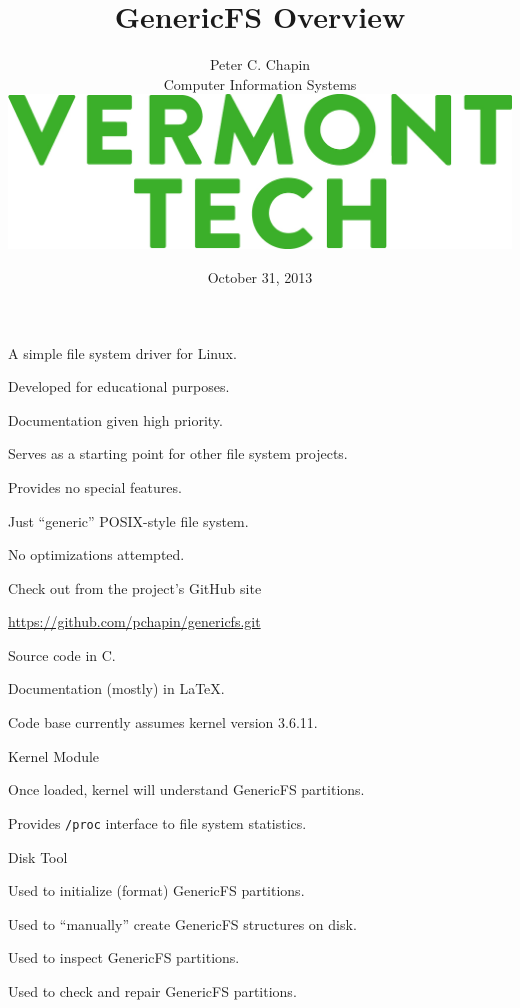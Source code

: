 \documentclass[landscape]{slides}
\title{\color{titlecolor}GenericFS Overview}
\author{
  \begin{tabular}{c}
  \\[3mm]
  \Large{Peter C. Chapin} \\[2mm]
  \normalsize{Computer Information Systems}\\[5mm]
  \includegraphics[scale=0.80]{VermontTech_stack_361.jpg}\\[16mm]
  \end{tabular}
}
\date{October 31, 2013}
\begin{document}
\color{Black}
\pagecolor{Background}

\maketitle


\begin{citemize}
  \item A simple file system driver for Linux.
    \begin{citemize}
    \item Developed for educational purposes.
    \item Documentation given high priority.
    \item Serves as a starting point for other file system projects.
    \end{citemize}
  \item Provides no special features.
    \begin{citemize}
    \item Just ``generic'' POSIX-style file system.
    \item No optimizations attempted.
    \end{citemize}
\end{citemize}
\stopslide


Check out from the project's GitHub site

\vspace{5mm}
\centerline{\url{https://github.com/pchapin/genericfs.git}}

\begin{citemize}
\item Source code in C.
\item Documentation (mostly) in \LaTeX.
\item Code base currently assumes kernel version 3.6.11.
\end{citemize}
\stopslide


\begin{citemize}
\item Kernel Module
\begin{citemize}
\item Once loaded, kernel will understand GenericFS partitions.
\item Provides \texttt{/proc} interface to file system statistics.
\end{citemize}

\item Disk Tool
\begin{citemize}
\item Used to initialize (format) GenericFS partitions.
\item Used to ``manually'' create GenericFS structures on disk.
\item Used to inspect GenericFS partitions.
\item Used to check and repair GenericFS partitions.
\end{citemize}
\end{citemize}
\stopslide
\end{document}
